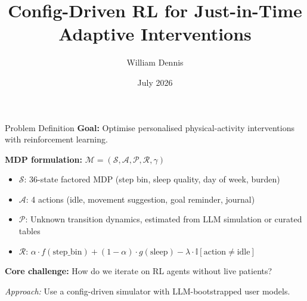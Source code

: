 \documentclass[aspectratio=169]{beamer}
\title[RL Health Interventions]
{Config-Driven RL for Just-in-Time Adaptive Interventions}
\author{William Dennis}
\institute[UoB / NUS]
{University of Bristol \and National University of Singapore}
\date{July 2026}
\begin{document}

\begin{frame}
    \titlepage
\end{frame}

\begin{frame}{Problem Definition}
    \textbf{Goal:} Optimise personalised physical-activity interventions with reinforcement learning.

    \vspace{4pt}
    \textbf{MDP formulation:} \(\mathcal{M} = (\mathcal{S}, \mathcal{A}, \mathcal{P}, \mathcal{R}, \gamma)\)
    \begin{itemize}
        \item \(\mathcal{S}\): 36-state factored MDP (step bin, sleep quality, day of week, burden)
        \item \(\mathcal{A}\): 4 actions (idle, movement suggestion, goal reminder, journal)
        \item \(\mathcal{P}\): Unknown transition dynamics, estimated from LLM simulation or curated tables
        \item \(\mathcal{R}\): \(\alpha\!\cdot\!f(\text{step\_bin}) + (1{-}\alpha)\!\cdot\!g(\text{sleep}) - \lambda\!\cdot\!\mathbb{I}[\text{action} \neq \text{idle}]\)
    \end{itemize}

    \vspace{6pt}
    \textbf{Core challenge:} How do we iterate on RL agents without live patients?

    \vspace{4pt}
    \textit{Approach:} Use a config-driven simulator with LLM-bootstrapped user models.
\end{frame}
\end{document}
